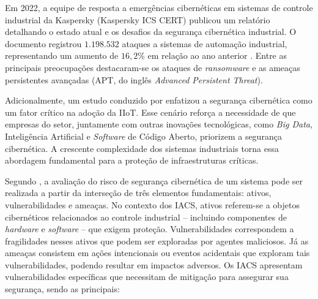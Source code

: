     Em 2022, a equipe de resposta a emergências cibernéticas em sistemas de controle industrial da Kaspersky (Kaspersky ICS CERT) publicou um relatório detalhando o estado atual e os desafios da segurança cibernética industrial. O documento registrou $1.198.532$ ataques a sistemas de automação industrial, representando um aumento de $16,2$\% em relação ao ano anterior \cite{kaspersky2023}. Entre as principais preocupações destacaram-se os ataques de \textit{ransomware} e as ameaças persistentes avançadas (APT, do inglês \textit{Advanced Persistent Threat}).

    Adicionalmente, um estudo conduzido por  enfatizou a segurança cibernética como um fator crítico na adoção da IIoT. Esse cenário reforça a necessidade de que empresas do setor, juntamente com outras inovações tecnológicas, como \textit{Big Data}, Inteligência Artificial e \textit{Software} de Código Aberto, priorizem a segurança cibernética. A crescente complexidade dos sistemas industriais torna essa abordagem fundamental para a proteção de infraestruturas críticas.

    Segundo , a avaliação do risco de segurança cibernética de um sistema pode ser realizada a partir da interseção de três elementos fundamentais: ativos, vulnerabilidades e ameaças. No contexto dos IACS, ativos referem-se a objetos cibernéticos relacionados ao controle industrial -- incluindo componentes de \textit{hardware} e \textit{software} -- que exigem proteção. Vulnerabilidades correspondem a fragilidades nesses ativos que podem ser exploradas por agentes maliciosos. Já as ameaças consistem em ações intencionais ou eventos acidentais que exploram tais vulnerabilidades, podendo resultar em impactos adversos. Os IACS apresentam vulnerabilidades específicas que necessitam de mitigação para assegurar sua segurança, sendo as principais:

